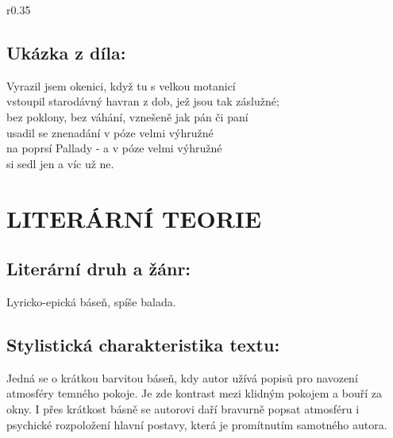 \documentclass{extarticle} %
\begin{document}
\noindent\begin{wrapfigure}{r}{0.35\textwidth}
\tiny

\subsection*{Ukázka z díla:}
\setlength{\parindent}{3pt}
\begin{center}
\noindent
Vyrazil jsem okenici, když tu s velkou motanicí \\
vstoupil starodávný havran z dob, jež jsou tak záslužné; \\
bez poklony, bez váhání, vznešeně jak pán či paní \\
usadil se znenadání v póze velmi výhružné \\
na poprsí Pallady - a v póze velmi výhružné \\
si sedl jen a víc už ne. 
\end{center}
\end{wrapfigure}

\section*{LITERÁRNÍ TEORIE}

\subsection*{Literární druh a žánr:}
\noindent 
Lyricko-epická báseň, spíše balada.





\subsection*{Stylistická charakteristika textu:}
\noindent 
Jedná se o krátkou barvitou báseň, kdy autor užívá popisů pro navození atmosféry temného pokoje. Je zde kontrast mezi klidným pokojem a bouří za okny. I přes krátkost básně se autorovi daří bravurně popsat atmosféru i psychické rozpoložení hlavní postavy, která je promítnutím samotného autora.
\end{document}
